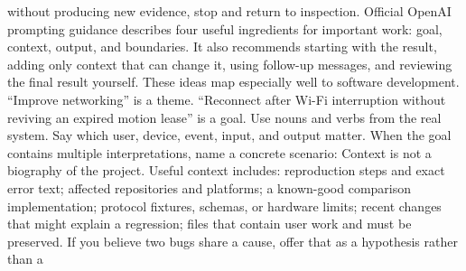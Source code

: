 {}without producing new evidence, stop and return to inspection.\markdownRendererInterblockSeparator
{}\markdownRendererThematicBreak{}\markdownRendererInterblockSeparator
{}
\markdownRendererSectionEnd 
\markdownRendererSectionEnd \markdownRendererSectionBegin
{}\markdownRendererInterblockSeparator
{}Official OpenAI prompting guidance describes four useful ingredients for\markdownRendererSoftLineBreak
{}important work: goal, context, output, and boundaries. It also recommends\markdownRendererSoftLineBreak
{}starting with the result, adding only context that can change it, using\markdownRendererSoftLineBreak
{}follow-up messages, and reviewing the final result yourself. These ideas map\markdownRendererSoftLineBreak
{}especially well to software development.\markdownRendererInterblockSeparator
{}\markdownRendererSectionBegin
{}\markdownRendererInterblockSeparator
{}“Improve networking” is a theme. “Reconnect after Wi-Fi interruption without\markdownRendererSoftLineBreak
{}reviving an expired motion lease” is a goal. Use nouns and verbs from the real\markdownRendererSoftLineBreak
{}system. Say which user, device, event, input, and output matter.\markdownRendererParagraphSeparator
{}When the goal contains multiple interpretations, name a concrete scenario:\markdownRendererInterblockSeparator
{}\markdownRendererInterblockSeparator
{}
\markdownRendererSectionEnd \markdownRendererSectionBegin
{}\markdownRendererInterblockSeparator
{}Context is not a biography of the project. Useful context includes:\markdownRendererInterblockSeparator
{}\markdownRendererUlBegin
\markdownRendererUlItem reproduction steps and exact error text;\markdownRendererUlItemEnd 
\markdownRendererUlItem affected repositories and platforms;\markdownRendererUlItemEnd 
\markdownRendererUlItem a known-good comparison implementation;\markdownRendererUlItemEnd 
\markdownRendererUlItem protocol fixtures, schemas, or hardware limits;\markdownRendererUlItemEnd 
\markdownRendererUlItem recent changes that might explain a regression;\markdownRendererUlItemEnd 
\markdownRendererUlItem files that contain user work and must be preserved.\markdownRendererUlItemEnd 
\markdownRendererUlEnd \markdownRendererInterblockSeparator
{}If you believe two bugs share a cause, offer that as a hypothesis rather than a\markdownRendererSoftLineBreak
